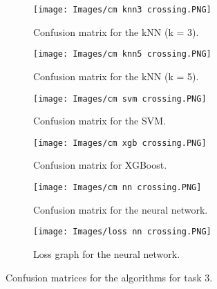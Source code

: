 \documentclass{article}
\begin{document}
%
\begin{figure}[ht]
\centering
\begin{subfigure}{.45\textwidth}
\centering
\texttt{[image: Images/cm knn3 crossing.PNG]}
\caption{Confusion matrix for the kNN (k = 3).}
\end{subfigure}
\hfill
\begin{subfigure}{.45\textwidth}
\centering
\texttt{[image: Images/cm knn5 crossing.PNG]}
\caption{Confusion matrix for the kNN (k = 5).}
\end{subfigure}
\medskip

\begin{subfigure}{.45\textwidth}
\centering
\texttt{[image: Images/cm svm crossing.PNG]}
\caption{Confusion matrix for the SVM.}
\end{subfigure}
\hfill
\begin{subfigure}{.45\textwidth}
\centering
\texttt{[image: Images/cm xgb crossing.PNG]}
\caption{Confusion matrix for XGBoost.}
\end{subfigure}
\medskip

\begin{subfigure}{.45\textwidth}
\centering
\texttt{[image: Images/cm nn crossing.PNG]}
\caption{Confusion matrix for the neural network.}
\end{subfigure}
\hfill
\begin{subfigure}{.45\textwidth}
\centering
\texttt{[image: Images/loss nn crossing.PNG]}
\caption{Loss graph for the neural network.}
\end{subfigure}

\caption{Confusion matrices for the algorithms for task 3.}
\label{fig:cm_crossing}
\end{figure}
%
\end{document}
